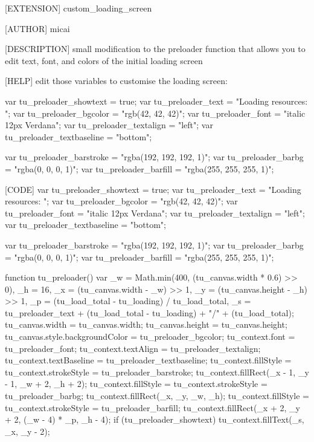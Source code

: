 [EXTENSION]
custom_loading_screen

[AUTHOR]
micai

[DESCRIPTION]
small modification to the
preloader function that allows
you to edit text, font, and colors
of the initial loading screen

[HELP]
edit those variables to customise the loading screen:

var tu_preloader_showtext = true;
var tu_preloader_text = "Loading resources: ";
var tu_preloader_bgcolor = "rgb(42, 42, 42)";
var tu_preloader_font = "italic 12px Verdana";
var tu_preloader_textalign = "left";
var tu_preloader_textbaseline = "bottom";

var tu_preloader_barstroke = "rgba(192, 192, 192, 1)";
var tu_preloader_barbg = "rgba(0, 0, 0, 1)";
var tu_preloader_barfill = "rgba(255, 255, 255, 1)";

[CODE]
var tu_preloader_showtext = true;
var tu_preloader_text = "Loading resources: ";
var tu_preloader_bgcolor = "rgb(42, 42, 42)";
var tu_preloader_font = "italic 12px Verdana";
var tu_preloader_textalign = "left";
var tu_preloader_textbaseline = "bottom";

var tu_preloader_barstroke = "rgba(192, 192, 192, 1)";
var tu_preloader_barbg = "rgba(0, 0, 0, 1)";
var tu_preloader_barfill = "rgba(255, 255, 255, 1)";


function tu_preloader() {
	var _w = Math.min(400, (tu_canvas.width * 0.6) >> 0), _h = 16,
		_x = (tu_canvas.width - _w) >> 1, _y = (tu_canvas.height - _h) >> 1,
		_p = (tu_load_total - tu_loading) / tu_load_total,
		_s = tu_preloader_text + (tu_load_total - tu_loading) + "/" + (tu_load_total);
	tu_canvas.width = tu_canvas.width;
	tu_canvas.height = tu_canvas.height;
	tu_canvas.style.backgroundColor = tu_preloader_bgcolor;
	tu_context.font = tu_preloader_font;
	tu_context.textAlign = tu_preloader_textalign;
	tu_context.textBaseline = tu_preloader_textbaseline;
	tu_context.fillStyle = tu_context.strokeStyle = tu_preloader_barstroke;
	tu_context.fillRect(_x - 1, _y - 1, _w + 2, _h + 2);
	tu_context.fillStyle = tu_context.strokeStyle = tu_preloader_barbg;
	tu_context.fillRect(_x, _y, _w, _h);
	tu_context.fillStyle = tu_context.strokeStyle = tu_preloader_barfill;
	tu_context.fillRect(_x + 2, _y + 2, (_w - 4) * _p, _h - 4);
	if (tu_preloader_showtext) tu_context.fillText(_s, _x, _y - 2);
}

